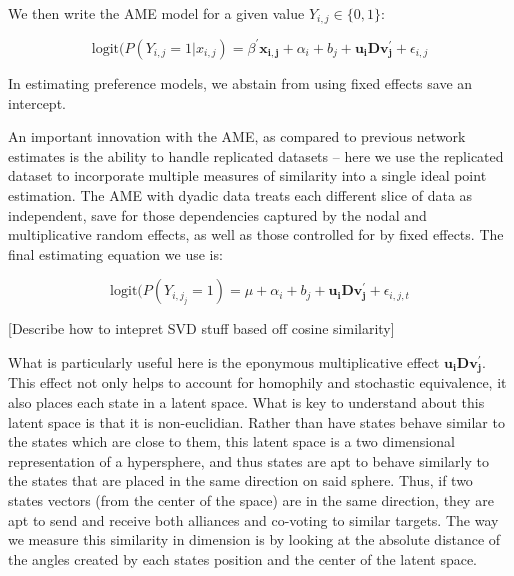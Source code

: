 We then write the AME model for a given value $Y_{i,j} \in \{0,1\}$:

\begin{equation}
	\text{logit}(P(Y_{i,j} = 1| x_{i,j}) = \beta^{'}\mathbf{x_{i,j}} + \alpha_{i} + b_{j} + \mathbf{u_{i}Dv^{'}_{j}} + \epsilon_{i,j}
\end{equation}

In estimating preference models, we abstain from using fixed effects save an intercept.

An important innovation with the AME, as compared to previous network estimates is the ability to handle replicated datasets -- here we use the replicated dataset to incorporate multiple measures of similarity into a single ideal point estimation.  The AME with dyadic data treats each different slice of data as independent, save for those dependencies captured by the nodal and multiplicative random effects, as well as those controlled for by fixed effects. The final estimating equation we use is:

\begin{equation}
	\text{logit}(P(Y_{i,j_j} = 1) = \mu + \alpha_{i} + b_{j} + \mathbf{u_{i}Dv^{'}_{j}} + \epsilon_{i,j,t}
\end{equation}

[Describe how to intepret SVD stuff based off cosine similarity]

What is particularly useful here is the eponymous multiplicative effect $\mathbf{u_{i}Dv^{'}_{j}}$. This effect not only helps to account for homophily and stochastic equivalence, it also places each state in a latent space. What is key to understand about this latent space is that it is non-euclidian. Rather than have states behave similar to the states which are close to them, this latent space is a two dimensional representation of a hypersphere, and thus states are apt to behave similarly to the states that are placed in the same direction on said sphere. Thus, if two states vectors (from the center of the space) are in the same direction, they are apt to send and receive both alliances and co-voting to similar targets. The way we measure this similarity in dimension is by looking at the absolute distance of the angles created by each states position and the center of the latent space. 